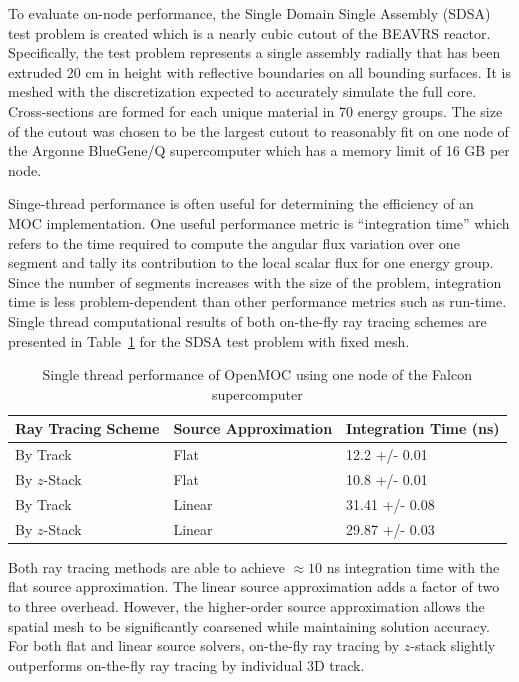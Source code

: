 \documentclass[12pt,twoside]{mitthesis-exec}
\begin{document}
To evaluate on-node performance, the Single Domain Single Assembly (SDSA) test problem is created which is a nearly cubic cutout of the BEAVRS reactor. Specifically, the test problem represents a single assembly radially that has been extruded 20 cm in height with reflective boundaries on all bounding surfaces. It is meshed with the discretization expected to accurately simulate the full core. Cross-sections are formed for each unique material in 70 energy groups. The size of the cutout was chosen to be the largest cutout to reasonably fit on one node of the Argonne BlueGene/Q supercomputer which has a memory limit of 16 GB per node.

Singe-thread performance is often useful for determining the efficiency of an MOC implementation. One useful performance metric is ``integration time'' which refers to the time required to compute the angular flux variation over one segment and tally its contribution to the local scalar flux for one energy group. Since the number of segments increases with the size of the problem, integration time is less problem-dependent than other performance metrics such as run-time. Single thread computational results of both on-the-fly ray tracing schemes are presented in Table~\ref{tab:rt-single-thread} for the SDSA test problem with fixed mesh.

\begin{table}[ht]
	\centering
	\caption{Single thread performance of OpenMOC using one node of the Falcon supercomputer}
	\medskip
	\begin{tabular}{l|l|l}
		\hline
		Ray Tracing Scheme & Source Approximation & Integration Time (ns) \\
		\hline
		By Track  & Flat & 12.2 +/- 0.01 \\
		By $z$-Stack & Flat & 10.8 +/- 0.01 \\
		\hline
		By Track  & Linear & 31.41 +/- 0.08 \\
		By $z$-Stack & Linear & 29.87 +/- 0.03 \\
		\hline
	\end{tabular}
	\label{tab:rt-single-thread}
\end{table}

Both ray tracing methods are able to achieve $\approx 10$ ns integration time with the flat source approximation. The linear source approximation adds a factor of two to three overhead. However, the higher-order source approximation allows the spatial mesh to be significantly coarsened while maintaining solution accuracy. For both flat and linear source solvers, on-the-fly ray tracing by $z$-stack slightly outperforms on-the-fly ray tracing by individual 3D track. 
\end{document}
